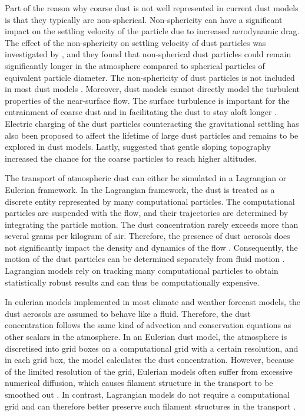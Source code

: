 Part of the reason why coarse dust is not well represented in current dust models is that they typically are non-spherical. Non-sphericity can have a significant impact on the settling velocity of the particle due to increased aerodynamic drag. The effect of the non-sphericity on settling velocity of dust particles was investigated by \textcite{mallios2020effects}, and they found that non-spherical dust particles could remain significantly longer in the atmosphere compared to spherical particles of equivalent particle diameter. The non-sphericity of dust particles is not included in most dust models \parencite{huang2020climate}. Moreover, dust models cannot directly model the turbulent properties of the near-surface flow. The surface turbulence is important for the entrainment of coarse dust \parencite{klose2013large} and in facilitating the dust to stay aloft longer \parencite{ryder2013impact}. Electric charging of the dust particles counteracting the gravitational settling has also been proposed to affect the lifetime of large dust particles and remains to be explored in dust models. Lastly, \textcite{heisel2021gentle} suggested that gentle sloping topography increased the chance for the coarse particles to reach higher altitudes.  

The transport of atmospheric dust can either be simulated in a Lagrangian or Eulerian framework.
In the Lagrangian framework, the dust is treated as a discrete entity represented by many computational particles.
The computational particles are suspended with the flow, and their trajectories are determined by integrating the particle motion. 
The dust concentration rarely exceeds more than several grams per kilogram of air. Therefore, the presence of dust aerosols does not significantly impact the density and dynamics of the flow \parencite{zhuang2001compositions}. Consequently, the motion of the dust particles can be determined separately from fluid motion \parencite{ShaoYaping2008PaMo}.
Lagrangian models rely on tracking many computational particles to obtain statistically robust results and can thus be computationally expensive. 

In eulerian models implemented in most climate and weather forecast models, the dust aerosols are assumed to behave like a fluid. Therefore, the dust concentration follows the same kind of advection and conservation equations as other scalars in the atmosphere. 
In an Eulerian dust model, the atmosphere is discretised into grid boxes on a computational grid with a certain resolution, and in each grid box, the model calculates the dust concentration. However, because of the limited resolution of the grid, Eulerian models often suffer from excessive numerical diffusion, which causes filament structure in the transport to be smoothed out \parencite{cassiani_offline_2016}. 
In contrast, Lagrangian models do not require a computational grid and can therefore better preserve such filament structures in the transport \parencite{cassiani_offline_2016}.         

